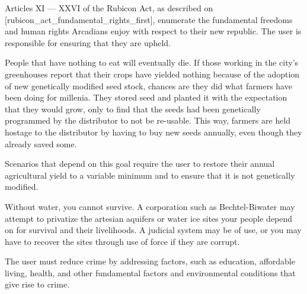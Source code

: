 
Articles XI --- XXVI of the Rubicon Act, as described on [rubicon_act_fundamental_rights_first], enumerate the fundamental freedoms and human rights Arcadians enjoy with respect to their new republic. The user is responsible for ensuring that they are upheld.


People that have nothing to eat will eventually die. If those working in the city's greenhouses report that their crops have yielded nothing because of the adoption of new genetically modified seed stock, chances are they did what farmers have been doing for millenia. They stored seed and planted it with the expectation that they would grow, only to find that the seeds had been genetically programmed by the distributor to not be re-usable. This way, farmers are held hostage to the distributor by having to buy new seeds annually, even though they already saved some.

Scenarios that depend on this goal require the user to restore their annual agricultural yield to a variable minimum and to ensure that it is not genetically modified.


Without water, you cannot survive. A corporation such as Bechtel-Biwater may attempt to privatize the artesian aquifers or water ice sites your people depend on for survival and their livelihoods. A judicial system may be of use, or you may have to recover the sites through use of force if they are corrupt.


The user must reduce crime by addressing factors, such as education, affordable living, health, and other fundamental factors and environmental conditions that give rise to crime.

\stopitemize

